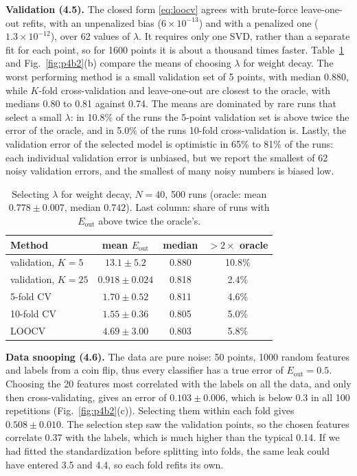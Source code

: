 \documentclass[conference]{IEEEtran}
\newcommand{\Eout}{E_{\mathrm{out}}}
\begin{document}
\textbf{Validation (4.5).} The closed form \eqref{eq:loocv} agrees with brute-force leave-one-out refits, with an unpenalized bias ($6\times10^{-13}$) and with a penalized one ($1.3\times10^{-12}$), over 62 values of $\lambda$. It requires only one SVD, rather than a separate fit for each point, so for 1600 points it is about a thousand times faster. Table~\ref{tab:cv} and Fig.~\ref{fig:p4b2}(b) compare the means of choosing $\lambda$ for weight decay. The worst performing method is a small validation set of 5 points, with median 0.880, while $K$-fold cross-validation and leave-one-out are closest to the oracle, with medians 0.80 to 0.81 against 0.74. The means are dominated by rare runs that select a small $\lambda$: in 10.8\% of the runs the 5-point validation set is above twice the error of the oracle, and in 5.0\% of the runs 10-fold cross-validation is. Lastly, the validation error of the selected model is optimistic in 65\% to 81\% of the runs: each individual validation error is unbiased, but we report the smallest of 62 noisy validation errors, and the smallest of many noisy numbers is biased low.

\begin{table}[!t]
\caption{Selecting $\lambda$ for weight decay, $N=40$, 500 runs (oracle: mean $0.778\pm0.007$, median $0.742$). Last column: share of runs with $\Eout$ above twice the oracle's.}
\label{tab:cv}
\centering\footnotesize
\begin{tabular}{lccc}
\toprule
Method & mean $\Eout$ & median & $>2\times$ oracle\\
\midrule
validation, $K=5$ & $13.1\pm5.2$ & 0.880 & 10.8\%\\
validation, $K=25$ & $0.918\pm0.024$ & 0.818 & 2.4\%\\
5-fold CV & $1.70\pm0.52$ & 0.811 & 4.6\%\\
10-fold CV & $1.55\pm0.36$ & 0.805 & 5.0\%\\
LOOCV & $4.69\pm3.00$ & 0.803 & 5.8\%\\
\bottomrule
\end{tabular}
\end{table}

\textbf{Data snooping (4.6).} The data are pure noise: 50 points, 1000 random features and labels from a coin flip, thus every classifier has a true error of $\Eout=0.5$. Choosing the 20 features most correlated with the labels on all the data, and only then cross-validating, gives an error of $0.103\pm0.006$, which is below 0.3 in all 100 repetitions (Fig.~\ref{fig:p4b2}(c)). Selecting them within each fold gives $0.508\pm0.010$. The selection step saw the validation points, so the chosen features correlate 0.37 with the labels, which is much higher than the typical 0.14. If we had fitted the standardization before splitting into folds, the same leak could have entered 3.5 and 4.4, so each fold refits its own.
\end{document}
